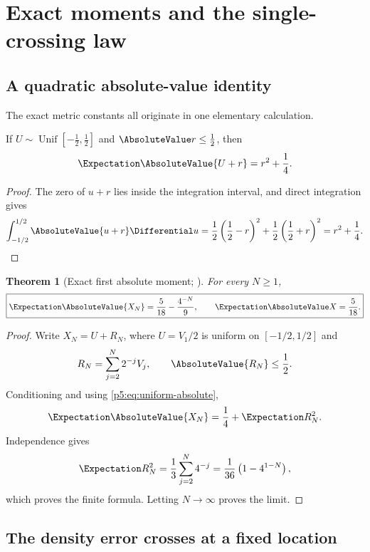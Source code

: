 \documentclass[11pt,oneside]{article}
\numberwithin{equation}{section}
\newtheorem{theorem}{Theorem}[section]
\theoremstyle{definition}
\theoremstyle{remark}
\begin{document}
\section{Exact moments and the single-crossing law}
\label{p5:sec:crossing}

\subsection{A quadratic absolute-value identity}

The exact metric constants all originate in one elementary calculation.

\begin{lemma}
If $U\sim\operatorname{Unif}[-\tfrac12,\tfrac12]$ and $\AbsoluteValue r\le\tfrac12$, then
\begin{equation}
 \Expectation\AbsoluteValue{U+r}=r^2+\frac14.
 \label{p5:eq:uniform-absolute}
\end{equation}
\end{lemma}

\begin{proof}
The zero of $u+r$ lies inside the integration interval, and direct integration gives
\[
 \int_{-1/2}^{1/2}\AbsoluteValue{u+r}\Differential u
 =\frac12\left(\frac12-r\right)^2
  +\frac12\left(\frac12+r\right)^2
 =r^2+\frac14.
\]
\end{proof}

\begin{theorem}[Exact first absolute moment; \newresult]
For every $N\ge1$,
\begin{equation}
 \boxed{
 \Expectation\AbsoluteValue{X_N}=\frac5{18}-\frac{4^{-N}}9,
 \qquad
 \Expectation\AbsoluteValue X=\frac5{18}.}
 \label{p5:eq:absolute-moments}
\end{equation}
\end{theorem}

\begin{proof}
Write $X_N=U+R_N$, where $U=V_1/2$ is uniform on $[-1/2,1/2]$ and
\[
 R_N=\sum_{j=2}^{N}2^{-j}V_j,
 \qquad \AbsoluteValue{R_N}\le\frac12.
\]
Conditioning and using \eqref{p5:eq:uniform-absolute},
\[
 \Expectation\AbsoluteValue{X_N}=\frac14+\Expectation R_N^2.
\]
Independence gives
\[
 \Expectation R_N^2=\frac13\sum_{j=2}^{N}4^{-j}
 =\frac1{36}\left(1-4^{1-N}\right),
\]
which proves the finite formula.  Letting $N\to\infty$ proves the limit.
\end{proof}

\subsection{The density error crosses at a fixed location}
\end{document}
